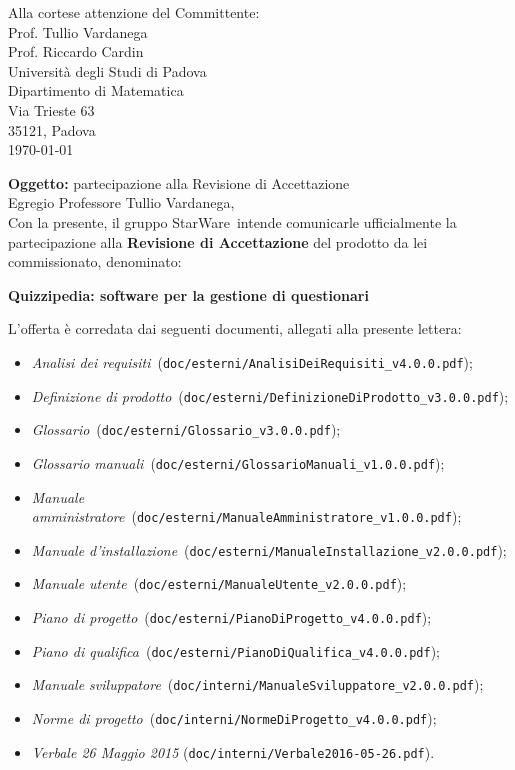 \documentclass[12pt,a4paper]{article}
\title{\titoloDocumento}
\newcommand{\nomeGruppo}{StarWare}
\newcommand{\uni}{Universit\`{a} degli Studi di Padova}
\newcommand{\Cardin}{Prof. Riccardo Cardin}
\newcommand{\Vardanega}{Prof. Tullio Vardanega}
\newcommand{\prjL}{Quizzipedia: software per la gestione di questionari}
\newcommand{\NdP}{\emph{Norme di progetto}}
\newcommand{\AdR}{\emph{Analisi dei requisiti}}
\newcommand{\PdP}{\emph{Piano di progetto}}
\newcommand{\PdQ}{\emph{Piano di qualifica}}
\newcommand{\DP}{\emph{Definizione di prodotto}}
\newcommand{\MA}{\emph{Manuale amministratore}}
\newcommand{\MU}{\emph{Manuale utente}}
\newcommand{\MI}{\emph{Manuale d'installazione}}
\newcommand{\MS}{\emph{Manuale sviluppatore}}
\newcommand{\GL}{\emph{Glossario}}
\newcommand{\GM}{\emph{Glossario manuali}}
\newcommand{\NdPv}{\texttt{NormeDiProgetto\_v4.0.0.pdf}}
\newcommand{\AdRv}{\texttt{AnalisiDeiRequisiti\_v4.0.0.pdf}}
\newcommand{\PdPv}{\texttt{PianoDiProgetto\_v4.0.0.pdf}}
\newcommand{\PdQv}{\texttt{PianoDiQualifica\_v4.0.0.pdf}}
\newcommand{\DPv}{\texttt{DefinizioneDiProdotto\_v3.0.0.pdf}}
\newcommand{\MAv}{\texttt{ManualeAmministratore\_v1.0.0.pdf}}
\newcommand{\MUv}{\texttt{ManualeUtente\_v2.0.0.pdf}}
\newcommand{\MIv}{\texttt{ManualeInstallazione\_v2.0.0.pdf}}
\newcommand{\MSv}{\texttt{ManualeSviluppatore\_v2.0.0.pdf}}
\newcommand{\GLv}{\texttt{Glossario\_v3.0.0.pdf}}
\newcommand{\GMv}{\texttt{GlossarioManuali\_v1.0.0.pdf}}
\newcommand{\filePath}[1]{\texttt{#1}}
\begin{document}
\hspace{8cm}\begin{minipage}[t]{10cm}
	Alla cortese attenzione del Committente: \\
	\Vardanega \\
	\Cardin \\
	\uni \\
	Dipartimento di Matematica\\
	Via Trieste 63\\
	35121, Padova\\
	\today \\
\end{minipage}

\vspace{2cm}

\textbf{Oggetto:} partecipazione alla Revisione di Accettazione\\

Egregio Professore Tullio Vardanega,\\
Con la presente, il gruppo \nomeGruppo\ intende comunicarle ufficialmente la partecipazione alla \textbf{Revisione di Accettazione} del prodotto da lei commissionato, denominato:
\begin{center}
	\textbf{\prjL}
\end{center}
L’offerta è corredata dai seguenti documenti, allegati alla presente lettera:

\begin{itemize}
	\item \AdR\ (\filePath{doc/esterni/}\AdRv);
	\item \DP\ (\filePath{doc/esterni/}\DPv);
	\item \GL\ (\filePath{doc/esterni/}\GLv);
	\item \GM\ (\filePath{doc/esterni/}\GMv);
	\item \MA\ (\filePath{doc/esterni/}\MAv);
	\item \MI\ (\filePath{doc/esterni/}\MIv);
	\item \MU\ (\filePath{doc/esterni/}\MUv);
	\item \PdP\ (\filePath{doc/esterni/}\PdPv);
	\item \PdQ\ (\filePath{doc/esterni/}\PdQv);
	\item \MS\ (\filePath{doc/interni/}\MSv);
	\item \NdP\ (\filePath{doc/interni/}\NdPv);
	\item \textit{Verbale 26 Maggio 2015} (\filePath{doc/interni/Verbale2016-05-26.pdf}).
\end{itemize}
\end{document}
